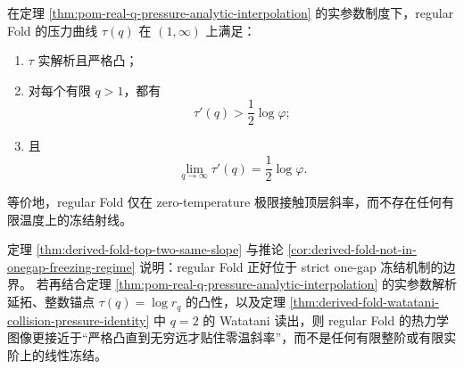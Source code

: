 \begin{conjecture}\label{conj:derived-fold-no-finite-temperature-freezing}
在定理 \ref{thm:pom-real-q-pressure-analytic-interpolation} 的实参数制度下，regular Fold 的压力曲线 \(\tau(q)\) 在 \((1,\infty)\) 上满足：
\begin{enumerate}
\normalfont
  \item \(\tau\) 实解析且严格凸；
  \item 对每个有限 \(q>1\)，都有
  \[
  \tau'(q)>\frac12\log\varphi;
  \]
  \item 且
  \[
  \lim_{q\to\infty}\tau'(q)=\frac12\log\varphi.
  \]
\end{enumerate}
等价地，regular Fold 仅在 zero-temperature 极限接触顶层斜率，而不存在任何有限温度上的冻结射线。
\end{conjecture}

\begin{remark}[同坡边界上的压力几何]\label{rem:derived-fold-sameslope-pressure-geometry}
定理 \ref{thm:derived-fold-top-two-same-slope} 与推论
\ref{cor:derived-fold-not-in-onegap-freezing-regime}
说明：regular Fold 正好位于 strict one-gap 冻结机制的边界。
若再结合定理 \ref{thm:pom-real-q-pressure-analytic-interpolation} 的实参数解析延拓、整数锚点 \(\tau(q)=\log r_q\) 的凸性，以及定理 \ref{thm:derived-fold-watatani-collision-pressure-identity} 中 \(q=2\) 的 Watatani 读出，则 regular Fold 的热力学图像更接近于“严格凸直到无穷远才贴住零温斜率”，而不是任何有限整阶或有限实阶上的线性冻结。
\end{remark}

\endinput
